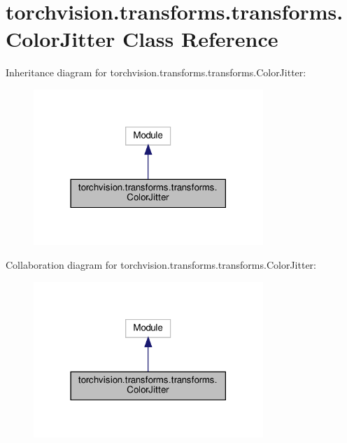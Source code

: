 \hypertarget{classtorchvision_1_1transforms_1_1transforms_1_1ColorJitter}{}\section{torchvision.\+transforms.\+transforms.\+Color\+Jitter Class Reference}
\label{classtorchvision_1_1transforms_1_1transforms_1_1ColorJitter}


Inheritance diagram for torchvision.\+transforms.\+transforms.\+Color\+Jitter\+:
\nopagebreak
\begin{figure}[H]
\begin{center}
\leavevmode
\includegraphics[width=246pt]{classtorchvision_1_1transforms_1_1transforms_1_1ColorJitter__inherit__graph}
\end{center}
\end{figure}


Collaboration diagram for torchvision.\+transforms.\+transforms.\+Color\+Jitter\+:
\nopagebreak
\begin{figure}[H]
\begin{center}
\leavevmode
\includegraphics[width=246pt]{classtorchvision_1_1transforms_1_1transforms_1_1ColorJitter__coll__graph}
\end{center}
\end{figure}
